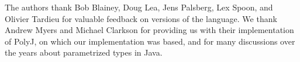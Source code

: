 \documentclass[preprint,nocopyrightspace,9pt]{sigplanconf}
\begin{document}
The authors thank Bob Blainey, 
Doug Lea, Jens Palsberg, Lex Spoon, and Olivier Tardieu
for valuable feedback on versions of the language.
We thank
Andrew Myers and
Michael Clarkson for providing us with their implementation of
PolyJ, on which our implementation was based, and for many
discussions over the years about parametrized types in Java.





% 
\end{document}

